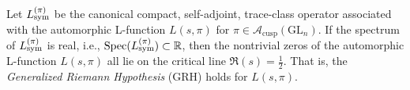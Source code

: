 \begin{lemma}
\label{lem:grh_spectral_reality}

Let \( L_{\mathrm{sym}}^{(\pi)} \) be the canonical compact, self-adjoint, trace-class operator associated with the automorphic L-function \( L(s, \pi) \) for \( \pi \in \mathcal{A}_{\text{cusp}}(\mathrm{GL}_n) \). If the spectrum of \( L_{\mathrm{sym}}^{(\pi)} \) is real, i.e., \( \operatorname{Spec}(L_{\mathrm{sym}}^{(\pi)}) \subset \mathbb{R} \), then the nontrivial zeros of the automorphic L-function \( L(s, \pi) \) all lie on the critical line \( \Re(s) = \frac{1}{2} \). That is, the \emph{Generalized Riemann Hypothesis} (GRH) holds for \( L(s, \pi) \).

\end{lemma}
